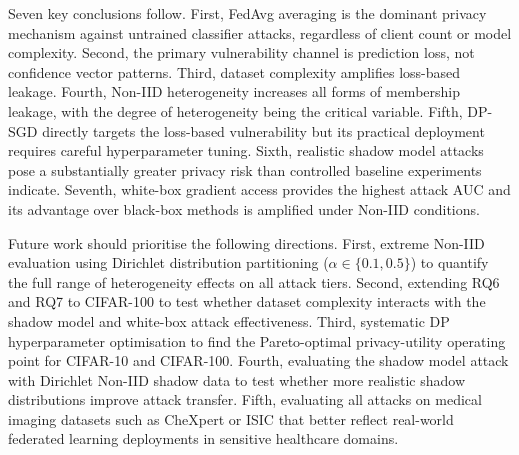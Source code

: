 \documentclass[12pt, a4paper]{report}
\begin{document}
Seven key conclusions follow. First, FedAvg averaging is the dominant privacy
mechanism against untrained classifier attacks, regardless of client count or
model complexity. Second, the primary vulnerability channel is prediction loss,
not confidence vector patterns. Third, dataset complexity amplifies loss-based
leakage. Fourth, Non-IID heterogeneity increases all forms of membership leakage,
with the degree of heterogeneity being the critical variable. Fifth, DP-SGD
directly targets the loss-based vulnerability but its practical deployment requires
careful hyperparameter tuning. Sixth, realistic shadow model attacks pose a
substantially greater privacy risk than controlled baseline experiments indicate.
Seventh, white-box gradient access provides the highest attack AUC and its
advantage over black-box methods is amplified under Non-IID conditions.

Future work should prioritise the following directions. First, extreme Non-IID
evaluation using Dirichlet distribution partitioning ($\alpha \in \{0.1, 0.5\}$)
to quantify the full range of heterogeneity effects on all attack tiers. Second,
extending RQ6 and RQ7 to CIFAR-100 to test whether dataset complexity interacts
with the shadow model and white-box attack effectiveness. Third, systematic DP
hyperparameter optimisation to find the Pareto-optimal privacy-utility operating
point for CIFAR-10 and CIFAR-100. Fourth, evaluating the shadow model attack
with Dirichlet Non-IID shadow data to test whether more realistic shadow
distributions improve attack transfer. Fifth, evaluating all attacks on medical
imaging datasets such as CheXpert or ISIC that better reflect real-world federated
learning deployments in sensitive healthcare domains.
\end{document}
